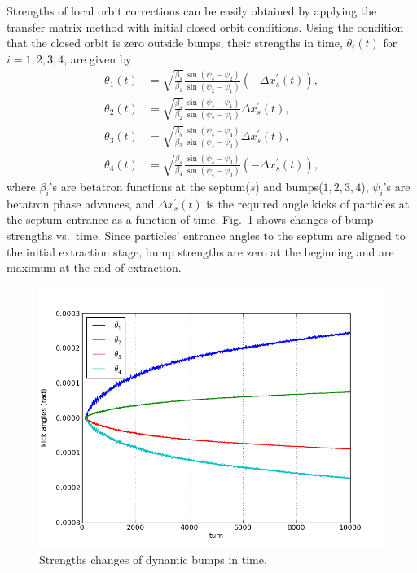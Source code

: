 \documentclass[aps,prstab,onecolumn,preprint,endfloats]{revtex4-1}
\begin{document}
Strengths of local orbit corrections can be easily obtained by applying the transfer matrix method with initial closed orbit conditions.
Using the condition that the closed orbit is zero outside bumps, their strengths in time, $\theta_{i}(t)$ for $i=1,2,3,4$, are given by
\begin{equation}
  \begin{split}
  \theta_{1}(t) & = \sqrt{\frac{\beta_{s}}{\beta_{1}}}
               \frac{\sin(\psi_{s} - \psi_{2})}
                    {\sin(\psi_{2} - \psi_{1})}
               \left( - \Delta x_{s}^{\prime} (t) \right),
  \\ %
  \theta_{2}(t) & = \sqrt{\frac{\beta_{s}}{\beta_{2}}}
               \frac{\sin(\psi_{s} - \psi_{1})}
                    {\sin(\psi_{2} - \psi_{1})}
               \Delta x_{s}^{\prime} (t), \\
  \theta_{3}(t) & = \sqrt{\frac{\beta_{s}}{\beta_{3}}}
               \frac{\sin(\psi_{s} - \psi_{4})}
                    {\sin(\psi_{4} - \psi_{3})}
               \Delta x_{s}^{\prime} (t),
  \\ %
  \theta_{4}(t) & = \sqrt{\frac{\beta_{s}}{\beta_{4}}}
               \frac{\sin(\psi_{s} - \psi_{3})}
                    {\sin(\psi_{4} - \psi_{3})}
               \left( - \Delta x_{s}^{\prime} (t) \right),
  \end{split}
\end{equation}
where $\beta_{i}$'s are betatron functions at the septum($s$) and bumps($1,2,3,4$), $\psi_{i}$'s are betatron phase advances, and $\Delta x^{\prime}_{s} (t)$ is the required angle kicks of particles at the septum entrance as a function of time.
Fig.~\ref{fig:bump2} shows changes of bump strengths vs.~time.
Since particles' entrance angles to the septum are aligned to the initial extraction stage, bump strengths are zero at the beginning and are maximum at the end of extraction.

\begin{figure}[!htbp]
  \includegraphics[width=.45\textwidth]{img/20140123-00.png}
  \caption{\label{fig:bump2}Strengths changes of dynamic bumps in time.}
\end{figure}
\end{document}

